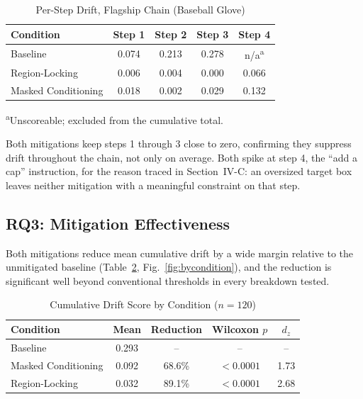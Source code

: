 \begin{table}[H]
\caption{Per-Step Drift, Flagship Chain (Baseball Glove)}
\label{tab:trajectory}
\centering
\small
\renewcommand{\arraystretch}{1.0}
\setlength{\tabcolsep}{4pt}
\begin{tabular}{@{}lcccc@{}}
\toprule
Condition & Step 1 & Step 2 & Step 3 & Step 4 \\
\midrule
Baseline             & 0.074 & 0.213 & 0.278 & n/a\textsuperscript{a} \\
Region-Locking       & 0.006 & 0.004 & 0.000 & 0.066 \\
Masked Conditioning  & 0.018 & 0.002 & 0.029 & 0.132 \\
\bottomrule
\end{tabular}
\vspace{1pt}
\raggedright\scriptsize\textsuperscript{a}Unscoreable; excluded from the cumulative total.
\end{table}

Both mitigations keep steps 1 through 3 close to zero, confirming they suppress drift throughout the chain, not only on average. Both spike at step 4, the ``add a cap'' instruction, for the reason traced in Section~IV-C: an oversized target box leaves neither mitigation with a meaningful constraint on that step.

\subsection{RQ3: Mitigation Effectiveness}
Both mitigations reduce mean cumulative drift by a wide margin relative to the unmitigated baseline (Table~\ref{tab:results}, Fig.~\ref{fig:bycondition}), and the reduction is significant well beyond conventional thresholds in every breakdown tested.

\begin{table}[H]
\caption{Cumulative Drift Score by Condition ($n=120$)}
\label{tab:results}
\centering
\small
\renewcommand{\arraystretch}{1.0}
\setlength{\tabcolsep}{4pt}
\begin{tabular}{@{}lcccc@{}}
\toprule
Condition & Mean & Reduction & Wilcoxon $p$ & $d_z$ \\
\midrule
Baseline             & 0.293 & --    & --       & -- \\
Masked Conditioning  & 0.092 & 68.6\% & $<0.0001$ & 1.73 \\
Region-Locking       & 0.032 & 89.1\% & $<0.0001$ & 2.68 \\
\bottomrule
\end{tabular}
\end{table}

